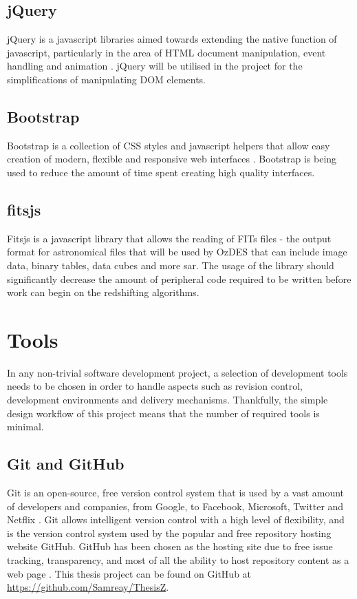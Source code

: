 \documentclass[titlesmallcaps, examinerscopy, copyrightpage]{uqthesis}
\begin{document}
\subsection{jQuery}

jQuery is a javascript libraries aimed towards extending the native function of javascript, particularly in the area of HTML document manipulation, event handling and animation \cite{jQuery}. jQuery will be utilised in the project for the simplifications of manipulating DOM elements.

\subsection{Bootstrap}

Bootstrap is a collection of CSS styles and javascript helpers that allow easy creation of modern, flexible and responsive web interfaces \cite{bootstrap}. Bootstrap is being used to reduce the amount of time spent creating high quality interfaces.


\subsection{fitsjs}

Fitsjs is a javascript library that allows the reading of FITs files - the output format for astronomical files that will be used by OzDES that can include image data, binary tables, data cubes and more \cite{fitsjs}sar. The usage of the library should significantly decrease the amount of peripheral code required to be written before work can begin on the redshifting algorithms.


\section{Tools}

In any non-trivial software development project, a selection of development tools needs to be chosen in order to handle aspects such as revision control, development environments and delivery mechanisms. Thankfully, the simple design workflow of this project means that the number of required tools is minimal.

\subsection{Git and GitHub}

Git is an open-source, free version control system that is used by a vast amount of developers and companies, from Google, to Facebook, Microsoft, Twitter and Netflix \cite{git}. Git allows intelligent version control with a high level of flexibility, and is the version control system used by the popular and free repository hosting website GitHub. GitHub has been chosen as the hosting site due to free issue tracking, transparency, and most of all the ability to host repository content as a web page \cite{GitHub}. This thesis project can be found on GitHub at \url{https://github.com/Samreay/ThesisZ}.
\end{document}
